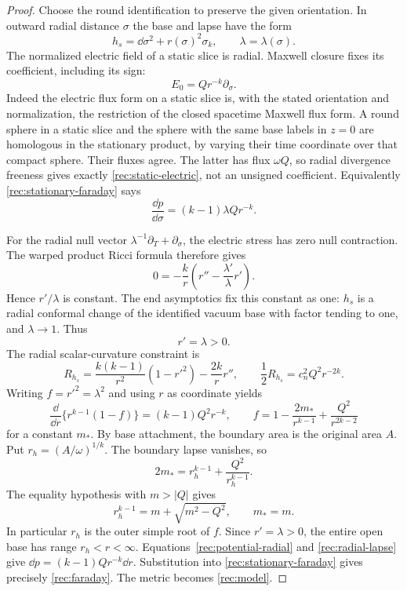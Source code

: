 \begin{proof}
Choose the round identification to preserve the given orientation.
In outward radial distance $\sigma$ the base and lapse have the form
\[
 h_s=\dd\sigma^2+r(\sigma)^2\sigma_k,\qquad
 \lambda=\lambda(\sigma).
\]
The normalized electric field of a static slice is radial. Maxwell
closure fixes its coefficient, including its sign:
\begin{equation}\label{rec:static-electric}
 E_0=Qr^{-k}\partial_\sigma.
\end{equation}
Indeed the electric flux form on a static slice is, with the stated
orientation and normalization, the restriction of the closed
spacetime Maxwell flux form. A round sphere in a static slice and
the sphere with the same base labels in $z=0$ are homologous in the
stationary product, by varying their time coordinate over that
compact sphere. Their fluxes agree. The latter has flux $\omega Q$,
so radial divergence freeness gives exactly
\eqref{rec:static-electric}, not an unsigned coefficient.
Equivalently \eqref{rec:stationary-faraday} says
\begin{equation}\label{rec:potential-radial}
 \frac{\dd p}{\dd\sigma}=(k-1)\lambda Qr^{-k}.
\end{equation}

For the radial null vector $\lambda^{-1}\partial_T+\partial_\sigma$,
the electric stress has zero null contraction. The warped product
Ricci formula therefore gives
\[
 0=-\frac{k}{r}\left(r''-\frac{\lambda'}{\lambda}r'\right).
\]
Hence $r'/\lambda$ is constant. The end asymptotics fix this
constant as one: $h_s$ is a radial conformal change of the identified
vacuum base with factor tending to one, and $\lambda\to1$.
Thus
\begin{equation}\label{rec:radial-lapse}
 r'=\lambda>0.
\end{equation}
The radial scalar-curvature constraint is
\[
 R_{h_s}=\frac{k(k-1)}{r^2}(1-r'^2)-\frac{2k}{r}r'',
 \qquad
 \frac12R_{h_s}=c_n^2Q^2r^{-2k}.
\]
Writing $f=r'^2=\lambda^2$ and using $r$ as coordinate yields
\begin{equation}\label{rec:radial-integration}
 \frac{\dd}{\dd r}\{r^{k-1}(1-f)\}
       =(k-1)Q^2r^{-k},\qquad
 f=1-\frac{2m_*}{r^{k-1}}+\frac{Q^2}{r^{2k-2}}
\end{equation}
for a constant $m_*$. By base attachment, the boundary area is the
original area $A$. Put $r_h=(A/\omega)^{1/k}$. The boundary lapse
vanishes, so
\[
 2m_*=r_h^{k-1}+\frac{Q^2}{r_h^{k-1}}.
\]
The equality hypothesis with $m>|Q|$ gives
\begin{equation}\label{rec:outer-radius}
 r_h^{k-1}=m+\sqrt{m^2-Q^2},\qquad m_*=m.
\end{equation}
In particular $r_h$ is the outer simple root of $f$. Since
$r'=\lambda>0$, the entire open base has range $r_h<r<\infty$.
Equations~\eqref{rec:potential-radial} and
\eqref{rec:radial-lapse} give
$\dd p=(k-1)Qr^{-k}\dd r$. Substitution into
\eqref{rec:stationary-faraday} gives precisely
\eqref{rec:faraday}. The metric becomes \eqref{rec:model}.


\end{proof}
